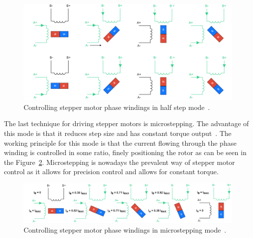 \begin{figure}[H]
    \centering
    \includegraphics[width=\textwidth]{obrazky/half_step_principle}
    \caption{Controlling stepper motor phase windings in half step mode~\cite{carmine_fiore_stepper_2021}.}
    \label{fig:stepper_half_step_mode}
\end{figure}

The last technique for driving stepper motors is microstepping.
The advantage of this mode is that it reduces step size and has constant torque output~\cite{carmine_fiore_stepper_2021}.
The working principle for this mode is that the current flowing through the phase winding is controlled in some ratio, finely positioning the rotor as can be seen in the Figure~\ref{fig:microstepping}.
Microstepping is nowadays the prevalent way of stepper motor control as it allows for precision control and allows for constant torque.

\begin{figure}[H]
    \centering
    \includegraphics[width=\textwidth]{obrazky/microstepping}
    \caption{Controlling stepper motor phase windings in microstepping mode~\cite{carmine_fiore_stepper_2021}.}
    \label{fig:microstepping}
\end{figure}

